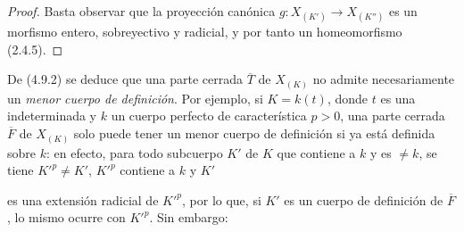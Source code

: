 \begin{proof}
Basta observar que la proyección canónica
$g:X_{(K')}\to X_{(K'')}$ es un morfismo entero, sobreyectivo y radicial, y
por tanto un homeomorfismo (2.4.5).
\end{proof}

\begin{remark}[4.9.3]
\label{IV.2.4.9.3-fr}
De (4.9.2) se deduce que una parte cerrada $\overline T$ de $X_{(K)}$ no
admite necesariamente un \emph{menor cuerpo de definición}. Por
ejemplo, si $K=k(t)$, donde $t$ es una indeterminada y $k$ un cuerpo perfecto
de característica $p>0$, una parte cerrada $\overline F$ de $X_{(K)}$ solo
puede tener un menor cuerpo de definición si ya está definida sobre
$k$: en efecto, para todo subcuerpo $K'$ de $K$ que contiene a $k$ y es
$\ne k$, se tiene $K'^p\ne K'$, $K'^p$ contiene a $k$ y $K'$


es una extensión radicial de $K'^p$, por lo que, si $K'$ es un cuerpo de
definición de $\overline F$, lo mismo ocurre con $K'^p$. Sin embargo:
\end{remark}
